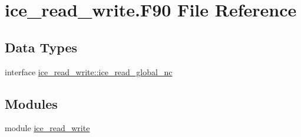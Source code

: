 \hypertarget{ice__read__write_8F90}{
\section{ice\_\-read\_\-write.F90 File Reference}
\label{ice__read__write_8F90}
}
\subsection*{Data Types}
\begin{DoxyCompactItemize}
\item 
interface \hyperlink{interfaceice__read__write_1_1ice__read__global__nc}{ice\_\-read\_\-write::ice\_\-read\_\-global\_\-nc}
\end{DoxyCompactItemize}
\subsection*{Modules}
\begin{DoxyCompactItemize}
\item 
module \hyperlink{namespaceice__read__write}{ice\_\-read\_\-write}
\end{DoxyCompactItemize}
